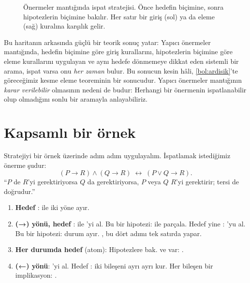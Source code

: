 \begin{figure}[p]
\caption{Önermeler mantığında ispat stratejisi. Önce hedefin biçimine,
sonra hipotezlerin biçimine bakılır. Her satır bir giriş (sol) ya da
eleme (sağ) kuralına karşılık gelir.}
\label{fig:strateji}
\end{figure}

Bu haritanın arkasında güçlü bir teorik sonuç yatar: Yapıcı önermeler
mantığında, hedefin biçimine göre giriş kurallarını, hipotezlerin
biçimine göre eleme kurallarını uygulayan ve aynı hedefe dönmemeye
dikkat eden sistemli bir arama, ispat varsa onu \emph{her zaman} bulur. Bu sonucun kesin hâli, \cref{bol:ardisik}'te
göreceğimiz kesme eleme teoreminin bir sonucudur. Yapıcı önermeler
mantığının \emph{karar verilebilir} olmasının nedeni de budur:
Herhangi bir önermenin ispatlanabilir olup olmadığını sonlu bir aramayla
anlayabiliriz.

\section{Kapsamlı bir örnek}\label{sec:kapsamli-ornek}

Stratejiyi bir örnek üzerinde adım adım uygulayalım. İspatlamak
istediğimiz önerme şudur:
\[
  (P \to R) \wedge (Q \to R) \;\leftrightarrow\; (P \vee Q \to R).
\]
``$P$ de $R$'yi gerektiriyorsa $Q$ da gerektiriyorsa, $P$ veya $Q$
$R$'yi gerektirir; tersi de doğrudur.''

\begin{enumerate}[adimlar]
  \item \textbf{Hedef }:  ile iki yöne ayır.
  \item \textbf{(→) yönü, hedef }:  ile
        'yi al. Bu bir  hipotezi:
         ile parçala. Hedef yine : 'yu
        al. Bu bir  hipotezi: durum ayır. , bu dört
        adımı tek satırda yapar.
  \item \textbf{Her durumda hedef } (atom): Hipotezlere bak.
         ve  var: .
  \item \textbf{(←) yönü}: 'yi al. Hedef : iki
        bileşeni ayrı ayrı kur. Her bileşen bir implikasyon: .
\end{enumerate}

